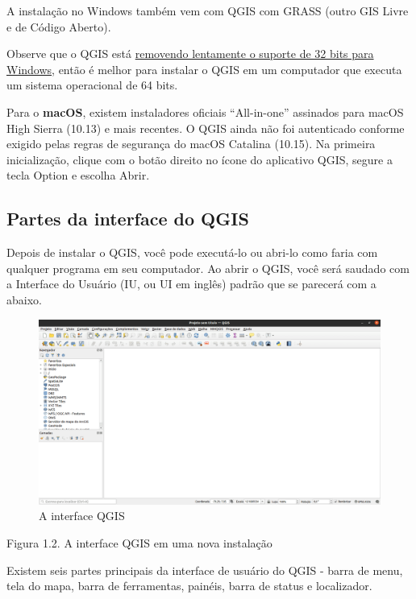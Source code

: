 \documentclass[
]{krantz}
\begin{document}
A instalação no Windows também vem com QGIS com GRASS (outro GIS Livre e de Código Aberto).

Observe que o QGIS está \href{https://blog.qgis.org/2020/10/15/phasing-out-32-bit-support-in-qgis/}{removendo lentamente o suporte de 32 bits para Windows}, então é melhor para instalar o QGIS em um computador que executa um sistema operacional de 64 bits.

Para o \textbf{macOS}, existem instaladores oficiais ``All-in-one'' assinados para macOS High Sierra (10.13) e mais recentes. O QGIS ainda não foi autenticado conforme exigido pelas regras de segurança do macOS Catalina (10.15). Na primeira inicialização, clique com o botão direito no ícone do aplicativo QGIS, segure a tecla Option e escolha Abrir.

\hypertarget{partes-da-interface-do-qgis}{%
\subsection{Partes da interface do QGIS}\label{partes-da-interface-do-qgis}}

Depois de instalar o QGIS, você pode executá-lo ou abri-lo como faria com qualquer programa em seu computador. Ao abrir o QGIS, você será saudado com a Interface do Usuário (IU, ou UI em inglês) padrão que se parecerá com a abaixo.

\begin{figure}
\centering
\includegraphics{media/modulo1/qgis-interface.png}
\caption{A interface QGIS}
\end{figure}

Figura 1.2. A interface QGIS em uma nova instalação

Existem seis partes principais da interface de usuário do QGIS - barra de menu, tela do mapa, barra de ferramentas, painéis, barra de status e localizador.
\end{document}
